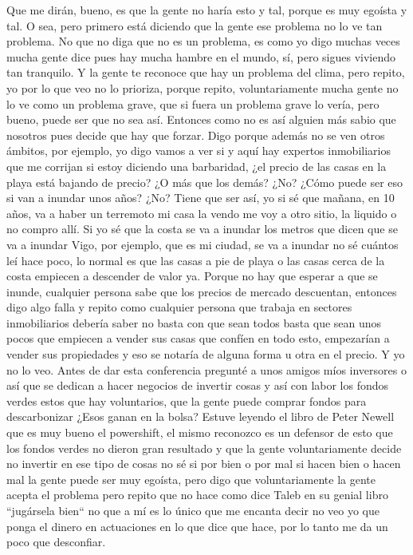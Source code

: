 Que me dirán, bueno, es que la gente no haría esto y tal, porque es muy egoísta y tal. O sea, pero primero está diciendo que la gente ese problema no lo ve tan problema. No que no diga que no es un problema, es como yo digo muchas veces mucha gente dice pues hay mucha hambre en el mundo, sí, pero sigues viviendo tan tranquilo. Y la gente te reconoce que hay un problema del clima, pero repito, yo por lo que veo no lo prioriza, porque repito, voluntariamente mucha gente no lo ve como un problema grave, que si fuera un problema grave lo vería, pero bueno, puede ser que no sea así. Entonces como no es así alguien más sabio que nosotros pues decide que hay que forzar. Digo porque además no se ven otros ámbitos, por ejemplo, yo digo vamos a ver si y aquí hay expertos inmobiliarios que me corrijan si estoy diciendo una barbaridad, ¿el precio de las casas en la playa está bajando de precio? ¿O más que los demás? ¿No? ¿Cómo puede ser eso si van a inundar unos años? ¿No? Tiene que ser así, yo si sé que mañana, en 10 años, va a haber un terremoto mi casa la vendo me voy a otro sitio, la liquido o no compro allí. Si yo sé que la costa se va a inundar los metros que dicen que se va a inundar Vigo, por ejemplo, que es mi ciudad, se va a inundar no sé cuántos leí hace poco, lo normal es que las casas a pie de playa o las casas cerca de la costa empiecen a descender de valor ya. Porque no hay que esperar a que se inunde, cualquier persona sabe que los precios de mercado descuentan, entonces digo algo falla y repito como cualquier persona que trabaja en sectores inmobiliarios debería saber no basta con que sean todos basta que sean unos pocos que empiecen a vender sus casas que confíen en todo esto, empezarían a vender sus propiedades y eso se notaría de alguna forma u otra en el precio. Y yo no lo veo. Antes de dar esta conferencia pregunté a unos amigos míos inversores o así que se dedican a hacer negocios de invertir cosas y así con labor los fondos verdes estos que hay voluntarios, que la gente puede comprar fondos para descarbonizar ¿Esos ganan en la bolsa? Estuve leyendo el libro de Peter Newell que es muy bueno el powershift, el mismo reconozco es un defensor de esto que los fondos verdes no dieron gran resultado y que la gente voluntariamente decide no invertir en ese tipo de cosas no sé si por bien o por mal si hacen bien o hacen mal la gente puede ser muy egoísta, pero digo que voluntariamente la gente acepta el problema pero repito que no hace como dice Taleb en su genial libro ``jugársela bien`` no que a mí es lo único que me encanta decir no veo yo que ponga el dinero en actuaciones en lo que dice que hace, por lo tanto me da un poco que desconfiar. 

